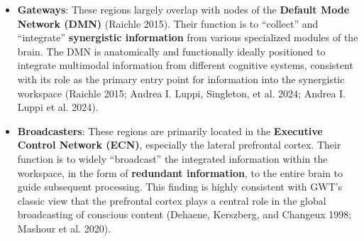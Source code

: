 \documentclass[
  a4paper]{article}
\providecommand{\tightlist}{%
  \setlength{\itemsep}{0pt}\setlength{\parskip}{0pt}}
\begin{document}
\begin{enumerate}
  \begin{itemize}
  \tightlist
  \item
    \textbf{Gateways}: These regions largely overlap with nodes of the
    \textbf{Default Mode Network (DMN)} (Raichle 2015). Their function
    is to ``collect'' and ``integrate'' \textbf{synergistic information}
    from various specialized modules of the brain. The DMN is
    anatomically and functionally ideally positioned to integrate
    multimodal information from different cognitive systems, consistent
    with its role as the primary entry point for information into the
    synergistic workspace (Raichle 2015; Andrea I. Luppi, Singleton, et
    al. 2024; Andrea I. Luppi et al. 2024).
  \item
    \textbf{Broadcasters}: These regions are primarily located in the
    \textbf{Executive Control Network (ECN)}, especially the lateral
    prefrontal cortex. Their function is to widely ``broadcast'' the
    integrated information within the workspace, in the form of
    \textbf{redundant information}, to the entire brain to guide
    subsequent processing. This finding is highly consistent with GWT's
    classic view that the prefrontal cortex plays a central role in the
    global broadcasting of conscious content (Dehaene, Kerszberg, and
    Changeux 1998; Mashour et al. 2020).
  \end{itemize}


\end{enumerate}
\end{document}

